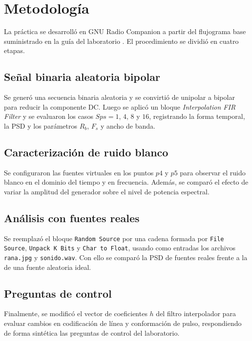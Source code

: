 \section{Metodología}

La práctica se desarrolló en GNU Radio Companion a partir del flujograma base suministrado en la guía del laboratorio \cite{guia_lab3,gnuradio}. El procedimiento se dividió en cuatro etapas.

\subsection{Señal binaria aleatoria bipolar}
Se generó una secuencia binaria aleatoria y se convirtió de unipolar a bipolar para reducir la componente DC. Luego se aplicó un bloque \textit{Interpolation FIR Filter} y se evaluaron los casos \(Sps=1\), \(4\), \(8\) y \(16\), registrando la forma temporal, la PSD y los parámetros \(R_b\), \(F_s\) y ancho de banda.

\subsection{Caracterización de ruido blanco}
Se configuraron las fuentes virtuales en los puntos \(p4\) y \(p5\) para observar el ruido blanco en el dominio del tiempo y en frecuencia. Además, se comparó el efecto de variar la amplitud del generador sobre el nivel de potencia espectral.

\subsection{Análisis con fuentes reales}
Se reemplazó el bloque \texttt{Random Source} por una cadena formada por \texttt{File Source}, \texttt{Unpack K Bits} y \texttt{Char to Float}, usando como entradas los archivos \texttt{rana.jpg} y \texttt{sonido.wav}. Con ello se comparó la PSD de fuentes reales frente a la de una fuente aleatoria ideal.

\subsection{Preguntas de control}
Finalmente, se modificó el vector de coeficientes \(h\) del filtro interpolador para evaluar cambios en codificación de línea y conformación de pulso, respondiendo de forma sintética las preguntas de control del laboratorio.